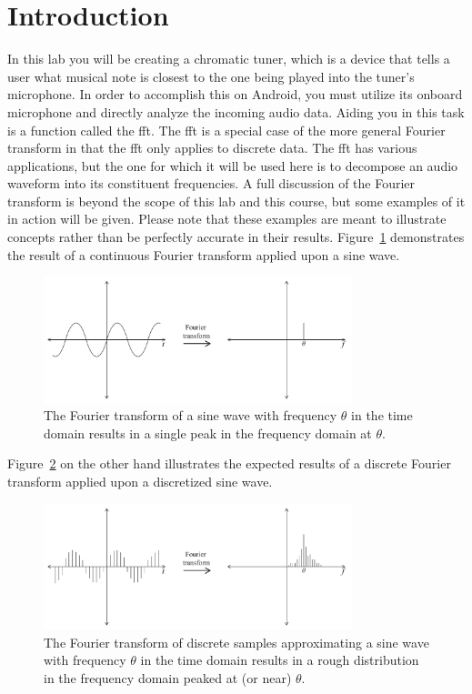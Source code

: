 \section{Introduction}

In this lab you will be creating a chromatic tuner, which is a device that tells a user what musical note is closest to the one being played into the tuner's microphone.
In order to accomplish this on Android, you must utilize its onboard microphone and directly analyze the incoming audio data.
Aiding you in this task is a function called the \ac{fft}.
The \ac{fft} is a special case of the more general Fourier transform in that the \ac{fft} only applies to discrete data.
The \ac{fft} has various applications, but the one for which it will be used here is to decompose an audio waveform into its constituent frequencies.
A full discussion of the Fourier transform is beyond the scope of this lab and this course, but some examples of it in action will be given.
Please note that these examples are meant to illustrate concepts rather than be perfectly accurate in their results.
Figure~\ref{fig:cft} demonstrates the result of a continuous Fourier transform applied upon a sine wave.
\begin{figure}[h]
\centering
\includegraphics[width=0.8\textwidth]{CFT.pdf}
\caption{The Fourier transform of a sine wave with frequency $\theta$ in the time domain results in a single peak in the frequency domain at $\theta$.}
\label{fig:cft}
\end{figure}
Figure~\ref{fig:dft} on the other hand illustrates the expected results of a discrete Fourier transform applied upon a discretized sine wave.
\begin{figure}[h]
\centering
\includegraphics[width=0.8\textwidth]{DFT.pdf}
\caption{The Fourier transform of discrete samples approximating a sine wave with frequency $\theta$ in the time domain results in a rough distribution in the frequency domain peaked at (or near) $\theta$.}
\label{fig:dft}
\end{figure}
